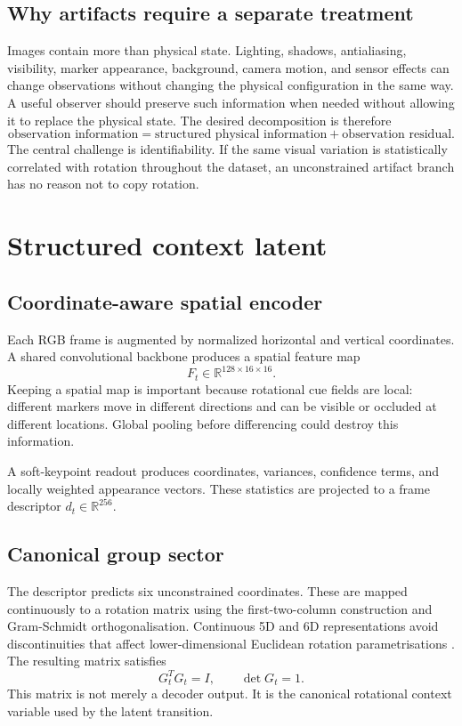 \documentclass[11pt,a4paper]{article}
\newcommand{\R}{\mathbb R}\newcommand{\SO}{\mathrm{SO}}\newcommand{\so}{\mathfrak{so}}\newcommand{\Exp}{\operatorname{Exp}}\newcommand{\sg}{\operatorname{sg}}\newcommand{\vct}[1]{\bm{#1}}
\begin{document}
\subsection{Why artifacts require a separate treatment}
Images contain more than physical state. Lighting, shadows, antialiasing, visibility, marker appearance, background, camera motion, and sensor effects can change observations without changing the physical configuration in the same way. A useful observer should preserve such information when needed without allowing it to replace the physical state. The desired decomposition is therefore
\begin{equation}
\text{observation information}=\text{structured physical information}+\text{observation residual}.
\end{equation}
The central challenge is identifiability. If the same visual variation is statistically correlated with rotation throughout the dataset, an unconstrained artifact branch has no reason not to copy rotation.

\section{Structured context latent}
\subsection{Coordinate-aware spatial encoder}
Each RGB frame is augmented by normalized horizontal and vertical coordinates. A shared convolutional backbone produces a spatial feature map
\begin{equation}
F_t\in\R^{128\times16\times16}.
\end{equation}
Keeping a spatial map is important because rotational cue fields are local: different markers move in different directions and can be visible or occluded at different locations. Global pooling before differencing could destroy this information.

A soft-keypoint readout produces coordinates, variances, confidence terms, and locally weighted appearance vectors. These statistics are projected to a frame descriptor $d_t\in\R^{256}$.

\subsection{Canonical group sector}
The descriptor predicts six unconstrained coordinates. These are mapped continuously to a rotation matrix using the first-two-column construction and Gram-Schmidt orthogonalisation. Continuous 5D and 6D representations avoid discontinuities that affect lower-dimensional Euclidean rotation parametrisations \citep{zhou2019rotation}. The resulting matrix satisfies
\begin{equation}
G_t^TG_t=I,\qquad\det G_t=1.
\end{equation}
This matrix is not merely a decoder output. It is the canonical rotational context variable used by the latent transition.
\end{document}
